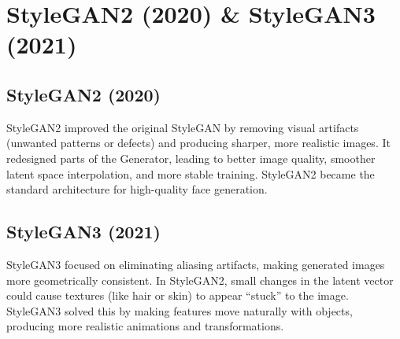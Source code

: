 \section{StyleGAN2 (2020) \& StyleGAN3 (2021)}

\subsection*{StyleGAN2 (2020)}

StyleGAN2 improved the original StyleGAN by removing visual artifacts (unwanted patterns or defects) and producing sharper, more realistic images. It redesigned parts of the Generator, leading to better image quality, smoother latent space interpolation, and more stable training. StyleGAN2 became the standard architecture for high-quality face generation.

\subsection*{StyleGAN3 (2021)}

StyleGAN3 focused on eliminating aliasing artifacts, making generated images more geometrically consistent. In StyleGAN2, small changes in the latent vector could cause textures (like hair or skin) to appear ``stuck'' to the image. StyleGAN3 solved this by making features move naturally with objects, producing more realistic animations and transformations.
